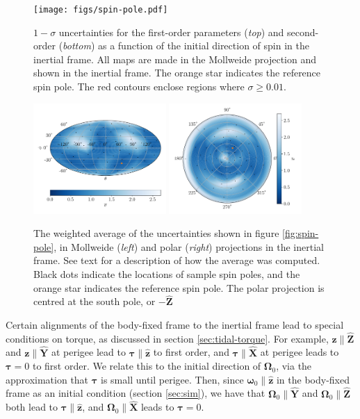 \documentclass[fleqn,usenatbib]{mnras}
\newcommand{\unit}[1]{\bm{\hat{#1}}}
\begin{document}
\begin{figure}
  \centering
  \texttt{[image: figs/spin-pole.pdf]}
  \caption{$1-\sigma$ uncertainties for the first-order parameters (\textit{top}) and second-order (\textit{bottom}) as a function of the initial direction of spin in the inertial frame. All maps are made in the Mollweide projection and shown in the inertial frame. The orange star indicates the reference spin pole. The red contours enclose regions where $\sigma \geq 0.01$.}
  \label{fig:scan-spin}
\end{figure}

\begin{figure}
  \centering
  \includegraphics[width=0.45\textwidth]{figs/spin-pole-avg-mollweide.pdf}
  \includegraphics[width=0.45\textwidth]{figs/spin-pole-avg-polar.pdf}
  \caption{The weighted average of the uncertainties shown in figure \ref{fig:spin-pole}, in Mollweide (\textit{left}) and polar (\textit{right}) projections in the inertial frame. See text for a description of how the average was computed. Black dots indicate the locations of sample spin poles, and the orange star indicates the reference spin pole. The polar projection is centred at the south pole, or $-\unit Z$}
  \label{fig:scan-spin-avg}
\end{figure}

Certain alignments of the body-fixed frame to the inertial frame lead to special conditions on torque, as discussed in section \ref{sec:tidal-torque}. For example, $\bm z \parallel \unit Z$ and $\bm z \parallel \unit Y$ at perigee lead to $\bm \tau \parallel \unit z$ to first order, and $\bm \tau \parallel \unit X$ at perigee leads to $\bm \tau = 0$ to first order. We relate this to the initial direction of $\bm \Omega_0$, via the approximation that $\bm \tau$ is small until perigee. Then, since $\bm \omega_0 \parallel \unit z$ in the body-fixed frame as an initial condition (section \ref{sec:sim}), we have that $\bm \Omega_0 \parallel \unit Y$ and $\bm \Omega_0 \parallel \unit Z$ both lead to $\bm \tau \parallel \unit z$, and $\bm \Omega_0 \parallel \unit X$ leads to $\bm \tau = 0$.
\end{document}
